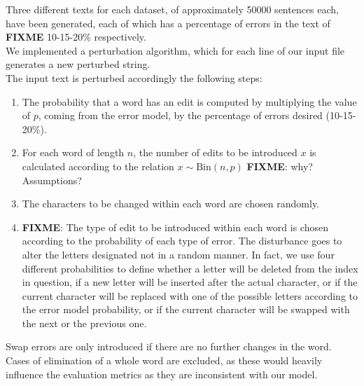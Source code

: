 Three different texts for each dataset, of approximately \num{50000} sentences each, have been generated, each of which 
has a percentage of errors in the text of \textbf{FIXME} \num{10}-\num{15}-\num{20}\% respectively. \\

We implemented a perturbation algorithm, which for each line of our input file generates a new perturbed string.\\
The input text is perturbed accordingly the following steps:

\begin{enumerate}
	\item The probability that a word has an edit is computed by multiplying the value of $p$, coming from the error model, 
	by the percentage of errors desired (10-15-20\%).
	\item For each word of length $n$, the number of edits to be introduced $x$ is calculated according to the relation $x 
	\sim \text{Bin}(n, p)$ \textbf{FIXME}: why? Assumptions?
	\item The characters to be changed within each word are chosen randomly.
	\item \textbf{FIXME}: The type of edit to be introduced within each word is chosen according to the probability of each 
	type of error.
	The disturbance goes to alter the letters designated not in a random manner. 
	In fact, we use four different probabilities to define whether a letter will be deleted from the index in question, if a new 
	letter will be inserted after the actual character, or if the current character will be replaced with one of the possible 
	letters according to the error model probability, or if the current character will be swapped with the next or the previous 
	one.
	
\end{enumerate}

Swap errors are only introduced if there are no further changes in the word. Cases of elimination of a whole word are 
excluded, as these would heavily influence the evaluation metrics as they are 
inconsistent with our model. 




